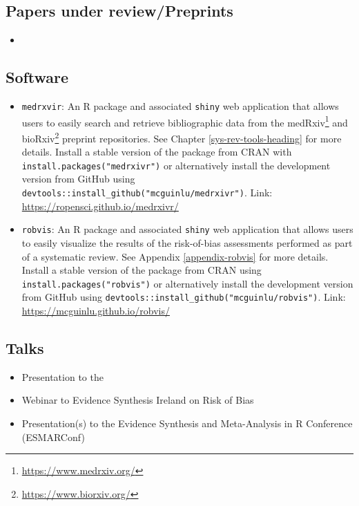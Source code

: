 \documentclass[a4paper, twoside]{templates/ociamthesis}
\providecommand{\tightlist}{%
  \setlength{\itemsep}{0pt}\setlength{\parskip}{0pt}}
\begin{document}
\hypertarget{papers-under-reviewpreprints}{%
\subsection{Papers under review/Preprints}\label{papers-under-reviewpreprints}}

\begin{itemize}
\item
\end{itemize}

\hypertarget{software}{%
\subsection{Software}\label{software}}

\begin{itemize}
\item
  \texttt{medrxvir}: An R package and associated \texttt{shiny} web application that allows users to easily search and retrieve bibliographic data from the medRxiv\footnote{\url{https://www.medrxiv.org/}} and bioRxiv\footnote{\url{https://www.biorxiv.org/}} preprint repositories. See Chapter \ref{sys-rev-tools-heading} for more details. Install a stable version of the package from CRAN with \texttt{install.packages("medrxivr")} or alternatively install the development version from GitHub using \texttt{devtools::install\_github("mcguinlu/medrxivr")}. Link: \url{https://ropensci.github.io/medrxivr/}
\item
  \texttt{robvis}: An R package and associated \texttt{shiny} web application that allows users to easily visualize the results of the risk-of-bias assessments performed as part of a systematic review. See Appendix \ref{appendix-robvis} for more details. Install a stable version of the package from CRAN using \texttt{install.packages("robvis")} or alternatively install the development version from GitHub using \texttt{devtools::install\_github("mcguinlu/robvis")}. Link: \url{https://mcguinlu.github.io/robvis/}
\end{itemize}

\hypertarget{talks}{%
\subsection{Talks}\label{talks}}

\begin{itemize}
\tightlist
\item
  Presentation to the
\item
  Webinar to Evidence Synthesis Ireland on Risk of Bias
\item
  Presentation(s) to the Evidence Synthesis and Meta-Analysis in R Conference (ESMARConf)
\end{itemize}
\end{document}

